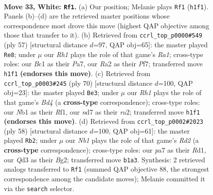 \documentclass[11pt]{article}
\begin{document}
\clearpage

\begin{figure}[p]\centering
\begin{subfigure}{0.46\textwidth}\centering
\resizebox{\linewidth}{!}{%
\newchessgame
\chessboard[
  setfen={q1b3k1/p2n1r1p/1r3b2/2p5/Pp1p1P2/1P1Q2N1/R3P3/1NBK3R w - - 12 33},
  showmover=false,
  pgfstyle=straightmove, color=movearrow, markmove={h1-f1}
]}
\caption{}
\end{subfigure}\hfill
\begin{subfigure}{0.46\textwidth}\centering
\resizebox{\linewidth}{!}{%
\newchessgame
\chessboard[
  setfen={r5k1/p4pb1/2rp1np1/P3q2p/4P3/R1NQ3P/3B1PP1/4R1K1 b - - 0 29},
  showmover=false,
  pgfstyle=straightmove, color=movearrow, markmove={a8-e8}
]}
\caption{}
\end{subfigure}
\\[4pt]
\begin{subfigure}{0.46\textwidth}\centering
\resizebox{\linewidth}{!}{%
\newchessgame
\chessboard[
  setfen={4rbk1/1q3ppp/2p1n3/3pPQ2/3B2NP/1P6/r1P1R1P1/5R1K w - - 3 36},
  showmover=false,
  pgfstyle=straightmove, color=movearrow, markmove={d4-e3}
]}
\caption{}
\end{subfigure}\hfill
\begin{subfigure}{0.46\textwidth}\centering
\resizebox{\linewidth}{!}{%
\newchessgame
\chessboard[
  setfen={4r1k1/1b1r1p2/1q4p1/1Pnp3p/p1pN3P/P1Q1P1P1/3R1PB1/3R2K1 w - - 1 30},
  showmover=false,
  pgfstyle=straightmove, color=movearrow, markmove={d2-b2}
]}
\caption{}
\end{subfigure}
\caption{\textbf{Move 33, White: \texttt{Rf1}.} (a) Our position; Melanie plays \texttt{Rf1} (\texttt{h1f1}). Panels (b)--(d) are the retrieved master positions whose correspondence most drove this move (highest QAP objective among those that transfer to it). (b) Retrieved from \texttt{ccrl\_top\_p0000\#549} (ply 57) [structural distance $d$=97, QAP obj=65]: the master played \texttt{Re8}; under $\mu$ our \emph{Rh1} plays the role of that game's \emph{Ra1}; cross-type roles: our \emph{B}c1 as their \emph{P}a7, our \emph{R}a2 as their \emph{P}f7; transferred move \texttt{h1f1} \textbf{(endorses this move)}. (c) Retrieved from \texttt{ccrl\_top\_p0003\#245} (ply 70) [structural distance $d$=100, QAP obj=23]: the master played \texttt{Be3}; under $\mu$ our \emph{Rh1} plays the role of that game's \emph{Bd4} (a \textbf{cross-type} correspondence); cross-type roles: our \emph{N}b1 as their \emph{R}f1, our \emph{n}d7 as their \emph{r}a2; transferred move \texttt{h1f1} \textbf{(endorses this move)}. (d) Retrieved from \texttt{ccrl\_top\_p0002\#2023} (ply 58) [structural distance $d$=100, QAP obj=61]: the master played \texttt{Rb2}; under $\mu$ our \emph{Nb1} plays the role of that game's \emph{Rd2} (a \textbf{cross-type} correspondence); cross-type roles: our \emph{p}a7 as their \emph{R}d1, our \emph{Q}d3 as their \emph{B}g2; transferred move \texttt{b1a3}. Synthesis: 2 retrieved analogs transferred to \texttt{Rf1} (summed QAP objective 88, the strongest correspondence among the candidate moves); Melanie committed it via the \texttt{search} selector.}
\label{fig:thought-m64}
\end{figure}
\end{document}
